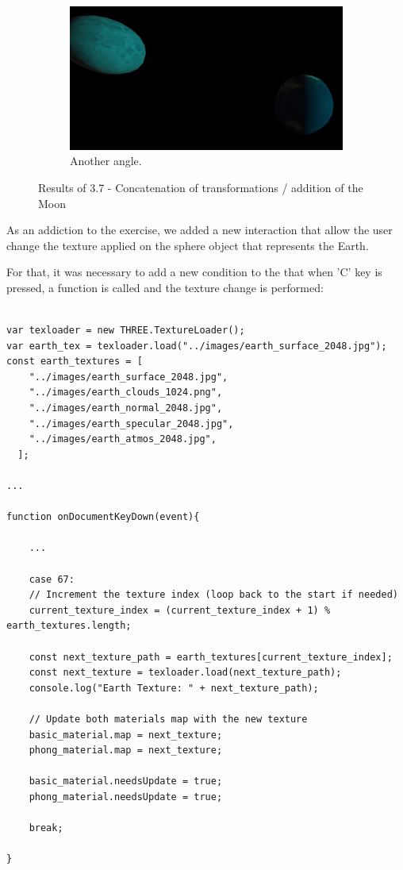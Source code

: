\documentclass[12pt]{article}
\begin{document}
\begin{figure}[!h]
    \begin{subfigure}{.33\textwidth}
        \centering
        \includegraphics[width = \textwidth]{figs/ex_37_3.png}
        \caption{Another angle.}
        \label{fig:ex_37_3}
    \end{subfigure}
\caption{Results of 3.7 - Concatenation of transformations / addition of the Moon}
\label{fig:ex_37}
\end{figure}

As an addiction to the exercise, we added a new interaction that allow the user change the texture applied on the sphere object that represents the Earth.\par

For that, it was necessary to add a new condition to the that when 'C' key is pressed, a function is called and the texture change is performed:

\begin{lstlisting}

var texloader = new THREE.TextureLoader();
var earth_tex = texloader.load("../images/earth_surface_2048.jpg");
const earth_textures = [
    "../images/earth_surface_2048.jpg",
    "../images/earth_clouds_1024.png",
    "../images/earth_normal_2048.jpg",
    "../images/earth_specular_2048.jpg",
    "../images/earth_atmos_2048.jpg",
  ];

...

function onDocumentKeyDown(event){ 

    ...

    case 67:
    // Increment the texture index (loop back to the start if needed)
    current_texture_index = (current_texture_index + 1) % earth_textures.length;
    
    const next_texture_path = earth_textures[current_texture_index];
    const next_texture = texloader.load(next_texture_path);
    console.log("Earth Texture: " + next_texture_path);
    
    // Update both materials map with the new texture
    basic_material.map = next_texture;
    phong_material.map = next_texture;

    basic_material.needsUpdate = true;
    phong_material.needsUpdate = true;

    break;

}

\end{lstlisting}
\end{document}
